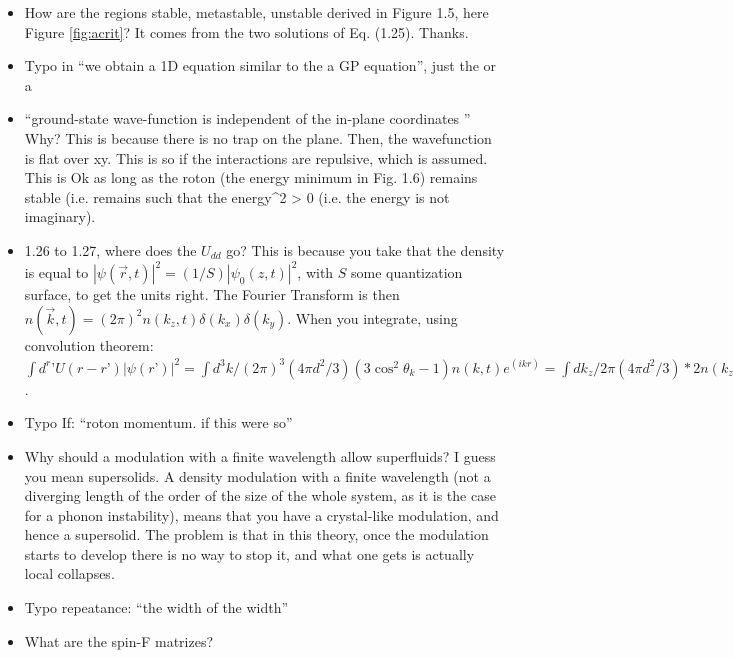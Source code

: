 \begin{itemize}
        \item How are the regions stable, metastable, unstable derived in Figure 1.5, here Figure \ref{fig:acrit}? 
        {\color{red}
            It comes from the two solutions of Eq. (1.25).
        }
        {\color{green}
            Thanks.
        }

\end{itemize}

\begin{itemize}
        \item Typo in ``we obtain a 1D equation similar to the a GP equation'', just the or a
        \item ``ground-state wave-function is independent of the in-plane coordinates '' Why?
        {\color{red}
         This is because there is no trap on the plane. Then, the wavefunction is flat over xy. This is so if the interactions are repulsive, which is assumed. This is Ok as long as the roton (the energy minimum in Fig. 1.6) remains stable (i.e. remains such that the energy^2 > 0 (i.e. the energy is not imaginary).
        }
        \item 1.26 to 1.27, where does the $U_{dd}$ go?
                {\color{red}
                This is because you take that the density is equal to  $|\psi(\vec r,t)|^2 = (1/S) |\psi_0(z,t)|^2$, with $S$ some quantization surface, to get the units right. The Fourier Transform is then
$n(\vec k,t) = (2\pi)^2 n(k_z,t) \delta(k_x) \delta(k_y)$. When you integrate, using convolution theorem:
$\int d^r’ U(r-r’) |\psi(r’)|^2 = \int d^3k/(2\pi)^3 (4\pi d^2/3) (3\cos^2\theta_k -1) n(k,t) e^(ikr)= 
\int dk_z/2\pi (4\pi d^2/3) * 2 n(k_z,t)  e^(i k_z z) = (8\pi d^2/3) |\psi_0(z,t)|^2 = g_d |\psi_0(z,t)|^2$. 
   }
        \item Typo If: ``roton momentum. if this were so''
        \item Why should a modulation with a finite wavelength allow superfluids?
                {\color{red} I guess you mean supersolids. 
                A density modulation with a finite wavelength (not a diverging length of the order of the size of the whole system, as it is the case for a phonon instability), means that you have a crystal-like modulation, and hence a supersolid. The problem is that in this theory, once the modulation starts to develop there is no way to stop it, and what one gets is actually local collapses.                
}
        \item Typo repeatance: ``the width of the width''
        \item What are the spin-F matrizes?

\end{itemize}
